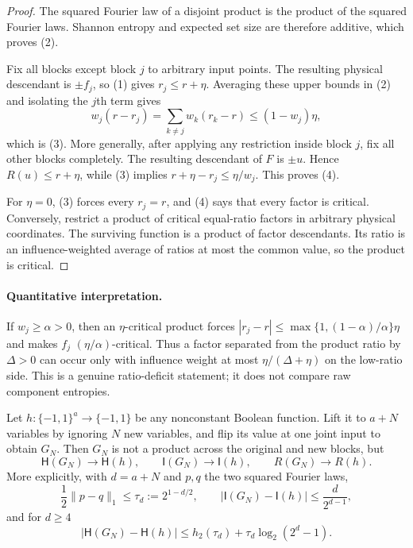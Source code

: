 \begin{proof}
The squared Fourier law of a disjoint product is the product of the squared
Fourier laws.  Shannon entropy and expected set size are therefore additive,
which proves (2).

Fix all blocks except block $j$ to arbitrary input points.  The resulting
physical descendant is $\pm f_j$, so (1) gives $r_j\le r+\eta$.  Averaging
these upper bounds in (2) and isolating the $j$th term gives
\[
 w_j(r-r_j)=\sum_{k\ne j}w_k(r_k-r)
 \le (1-w_j)\eta,
\]
which is (3).  More generally, after applying any restriction inside block
$j$, fix all other blocks completely.  The resulting descendant of $F$ is
$\pm u$.  Hence $R(u)\le r+\eta$, while (3) implies
$r+\eta-r_j\le\eta/w_j$.  This proves (4).

For $\eta=0$, (3) forces every $r_j=r$, and (4) says that every factor is
critical.  Conversely, restrict a product of critical equal-ratio factors in
arbitrary physical coordinates.  The surviving function is a product of
factor descendants.  Its ratio is an influence-weighted average of ratios at
most the common value, so the product is critical.
\end{proof}

\paragraph{Quantitative interpretation.}
If $w_j\ge\alpha>0$, then an $\eta$-critical product forces
$|r_j-r|\le\max\{1,(1-\alpha)/\alpha\}\eta$ and makes $f_j$
$(\eta/\alpha)$-critical.  Thus a factor separated from the product ratio by
$\Delta>0$ can occur only with influence weight at most
$\eta/(\Delta+\eta)$ on the low-ratio side.  This is a genuine ratio-deficit
statement; it does not compare raw component entropies.

\begin{proposition}
\label{prop:surgery}
Let $h:\{-1,1\}^a\to\{-1,1\}$ be any nonconstant Boolean function.  Lift it
to $a+N$ variables by ignoring $N$ new variables, and flip its value at one
joint input to obtain $G_N$.  Then $G_N$ is not a product across the original
and new blocks, but
\[
 \mathsf H(G_N)\longrightarrow\mathsf H(h),\qquad
 \mathsf I(G_N)\longrightarrow\mathsf I(h),\qquad
 R(G_N)\longrightarrow R(h).                         \tag{5}
\]
More explicitly, with $d=a+N$ and $p,q$ the two squared Fourier laws,
\[
 \frac12\|p-q\|_1\le \tau_d:=2^{1-d/2},\qquad
 |\mathsf I(G_N)-\mathsf I(h)|\le \frac d{2^{d-1}},  \tag{6}
\]
and for $d\ge4$
\[
 |\mathsf H(G_N)-\mathsf H(h)|
 \le h_2(\tau_d)+\tau_d\log_2(2^d-1).                \tag{7}
\]
\end{proposition}

